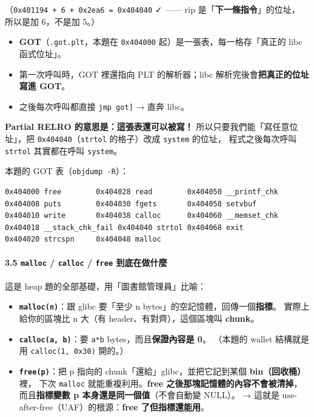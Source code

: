 \documentclass[10pt,a4paper]{article}
\providecommand{\tightlist}{%
  \setlength{\itemsep}{0pt}\setlength{\parskip}{0pt}}
\renewenvironment{quote}{%
  \begin{mdframed}[linewidth=0pt,innerleftmargin=0pt,innerrightmargin=0pt,
    innerbottommargin=0pt,innertopmargin=0pt,skipabove=0.55em,skipbelow=0.55em,
    leftmargin=0.9em,rightmargin=0.4em,startcode={\color{quotebar}\vrule width 2.6pt},%
    endcode={}]%
  \itshape\color{black}%
}{%
  \end{mdframed}%
}
\begin{document}
（\texttt{0x401194\ \allowbreak{}+\ \allowbreak{}6\ \allowbreak{}+\ \allowbreak{}0x2ea6\ \allowbreak{}=\ \allowbreak{}0x404040} ✓ ------ rip
是「\textbf{下一條指令}」的位址， 所以是加 6，不是加 5。）

\begin{itemize}
\tightlist
\item
  \textbf{GOT}（\texttt{.\allowbreak{}got.\allowbreak{}plt}，本題在 \texttt{0x404000}
  起）是一張表，每一格存「真正的 libc 函式位址」。
\item
  第一次呼叫時，GOT 裡還指向 PLT 的解析器；libc
  解析完後會\textbf{把真正的位址寫進 GOT}。
\item
  之後每次呼叫都直接 \texttt{jmp\ \allowbreak{}{[}got{]}} → 直奔 libc。
\end{itemize}

\begin{quote}
\textbf{Partial RELRO 的意思是：這張表還可以被寫！}
所以只要我們能「寫任意位址」，把 \texttt{0x404040}（\texttt{strtol}
的格子）改成 \texttt{system} 的位址， 程式之後每次呼叫 \texttt{strtol}
其實都在呼叫 \texttt{system}。
\end{quote}

本題的 GOT 表（\texttt{objdump\ \allowbreak{}-\allowbreak{}R}）：

\begin{Verbatim}[breaklines=true,breakanywhere=true,breakautoindent=false,fontsize=\fontsize{7.0}{9.5}\selectfont]
0x404000 free        0x404028 read        0x404050 __printf_chk
0x404008 puts        0x404030 fgets       0x404058 setvbuf
0x404010 write       0x404038 calloc      0x404060 __memset_chk
0x404018 __stack_chk_fail 0x404040 strtol 0x404068 exit
0x404020 strcspn     0x404048 malloc
\end{Verbatim}

\paragraph{\texorpdfstring{3.5 \texttt{malloc} / \texttt{calloc} /
\texttt{free}
到底在做什麼}{3.5 malloc / calloc / free 到底在做什麼}}\label{malloc-calloc-free-ux5230ux5e95ux5728ux505aux4ec0ux9ebc}

這是 heap 題的全部基礎，用「圖書館管理員」比喻：

\begin{itemize}
\tightlist
\item
  \textbf{\texttt{malloc(n)}}：跟 glibc 要「至少 n
  bytes」的空記憶體，回傳一個\textbf{指標}。 實際上給你的區塊比 n 大（有
  header、有對齊），這個區塊叫 \textbf{chunk}。
\item
  \textbf{\texttt{calloc(a,\allowbreak{}\ \allowbreak{}b)}}：要 \texttt{a*b}
  bytes，而且\textbf{保證內容是 0}。 （本題的 wallet 結構就是用
  \texttt{calloc(1,\allowbreak{}\ \allowbreak{}0x30)} 開的。）
\item
  \textbf{\texttt{free(p)}}：把 p 指向的
  chunk「還給」glibc，並把它記到某個 \textbf{bin（回收桶）} 裡， 下次
  \texttt{malloc} 就能重複利用。\textbf{free
  之後那塊記憶體的內容不會被清掉}， 而且\textbf{指標變數 p
  本身還是同一個值}（不會自動變 NULL）。 → 這就是
  use-after-free（UAF）的根源：\textbf{free 了但指標還能用}。
\end{itemize}
\end{document}
